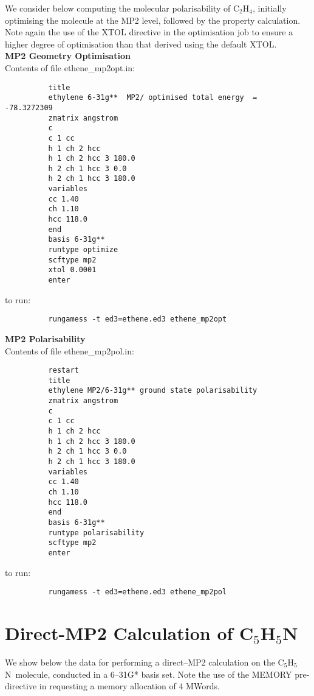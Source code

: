 \documentclass[11pt,fleqn]{article}
\newcommand{\ethene}{\mbox{C$_{2}$H$_{4}$}}
\newcommand{\pyridine}{\mbox{C$_{5}$H$_{5}$N}}
\begin{document}
We consider below computing the molecular polarisability of
\ethene, initially optimising the molecule at the MP2 level, followed
by the property calculation. Note again the use of the XTOL
directive in the optimisation job to ensure a higher degree
of optimisation than that derived using the default XTOL.\\

{\bf MP2 Geometry Optimisation}\\


Contents of file ethene\_mp2opt.in:
{
\footnotesize
\begin{verbatim}
          title 
          ethylene 6-31g**  MP2/ optimised total energy  =  -78.3272309
          zmatrix angstrom
          c
          c 1 cc
          h 1 ch 2 hcc
          h 1 ch 2 hcc 3 180.0
          h 2 ch 1 hcc 3 0.0
          h 2 ch 1 hcc 3 180.0
          variables
          cc 1.40
          ch 1.10
          hcc 118.0
          end
          basis 6-31g**
          runtype optimize
          scftype mp2
          xtol 0.0001
          enter
\end{verbatim}
}
to run:
{
\footnotesize
\begin{verbatim}
          rungamess -t ed3=ethene.ed3 ethene_mp2opt
\end{verbatim}
}

{\bf MP2 Polarisability}\\

Contents of file ethene\_mp2pol.in:
{
\footnotesize
\begin{verbatim}
          restart
          title 
          ethylene MP2/6-31g** ground state polarisability
          zmatrix angstrom
          c
          c 1 cc
          h 1 ch 2 hcc
          h 1 ch 2 hcc 3 180.0
          h 2 ch 1 hcc 3 0.0
          h 2 ch 1 hcc 3 180.0
          variables
          cc 1.40
          ch 1.10
          hcc 118.0
          end
          basis 6-31g**
          runtype polarisability
          scftype mp2
          enter
\end{verbatim}
}
to run:
{
\footnotesize
\begin{verbatim}
          rungamess -t ed3=ethene.ed3 ethene_mp2pol
\end{verbatim}
}
\section[Direct-MP2 Calculation of \pyridine]{Direct-MP2 Calculation of \pyridine}

We show below the data for performing a direct--MP2 calculation
on the \pyridine\ molecule, conducted in a 6--31G* basis set. Note
the use of the MEMORY pre-directive in requesting
a memory allocation of 4 MWords.
\end{document}
